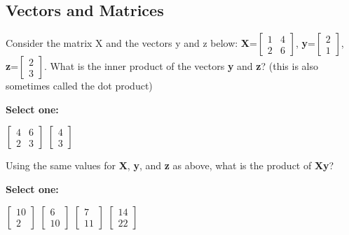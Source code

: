 \documentclass[11pt,addpoints,answers]{exam}
\numberwithin{equation}{section} %
\numberwithin{figure}{section} %
\numberwithin{table}{section} %
\begin{document}
\subsection{Vectors and Matrices}
\begin{questions}
    \question[1] Consider the matrix X and the vectors y and z below: \textbf{X}=$\begin{bmatrix} 1 & 4 \\ 2 & 6 \end{bmatrix}$, \textbf{y}=$\begin{bmatrix} 2 \\ 1 \end{bmatrix}$, \textbf{z}=$\begin{bmatrix} 2 \\ 3 \end{bmatrix}$. What is the inner product of the vectors \textbf{y} and \textbf{z}? (this is also sometimes called the dot product)

    \textbf{Select one:}
    \begin{checkboxes}
        \choice $\begin{bmatrix} 4 & 6 \\ 2 & 3 \end{bmatrix}$
        \choice $\begin{bmatrix} 4 \\ 3 \end{bmatrix}$
    \end{checkboxes}


    \question[1] Using the same values for \textbf{X}, \textbf{y}, and \textbf{z} as above, what is the product of \textbf{Xy}?

    \textbf{Select one:}
    \begin{checkboxes}
        \choice $\begin{bmatrix} 10 \\ 2 \end{bmatrix}$
        \choice $\begin{bmatrix} 6 \\ 10 \end{bmatrix}$
        \choice $\begin{bmatrix} 7 \\ 11 \end{bmatrix}$
        \choice $\begin{bmatrix} 14 \\ 22 \end{bmatrix}$
    \end{checkboxes}



\end{questions}
\end{document}
